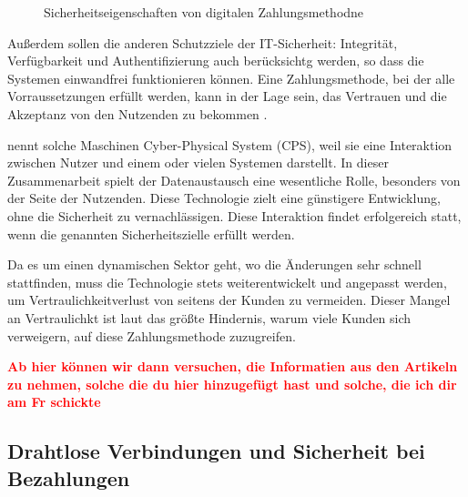 \begin{figure}[htb]
    \caption{Sicherheitseigenschaften von digitalen Zahlungsmethodne}
    \label{fig:refark_HARE}
\end{figure}


Außerdem sollen die anderen Schutzziele der IT-Sicherheit: Integrität, Verfügbarkeit und
Authentifizierung auch berücksichtg werden, so dass die Systemen einwandfrei funktionieren können.
Eine Zahlungsmethode, bei der alle Vorraussetzungen erfüllt werden, kann in der Lage sein, das Vertrauen und 
die Akzeptanz von den Nutzenden zu bekommen \cite{refart:HARE}. 


\cite{inbook:MHNS} nennt solche Maschinen Cyber-Physical System (CPS), weil sie eine Interaktion zwischen 
Nutzer und einem oder vielen Systemen darstellt. In dieser Zusammenarbeit spielt der Datenaustausch 
eine wesentliche Rolle, besonders von der Seite der Nutzenden. Diese Technologie zielt eine günstigere 
Entwicklung, ohne die Sicherheit zu vernachlässigen. Diese Interaktion findet erfolgereich statt, 
wenn die genannten Sicherheitszielle erfüllt werden.


Da es um einen dynamischen Sektor geht, wo die Änderungen sehr schnell stattfinden, \cite{S} 
muss die Technologie stets weiterentwickelt und angepasst werden, um Vertraulichkeitverlust von seitens
der Kunden zu vermeiden. Dieser Mangel an Vertraulichkt ist laut das größte Hindernis, warum viele
Kunden sich verweigern, auf diese Zahlungsmethode zuzugreifen.

\textbf{\textcolor{red}{Ab hier können wir dann versuchen, die Informatien aus den Artikeln zu nehmen, solche
die du hier hinzugefügt hast und solche, die ich dir am Fr schickte}}

\subsection{Drahtlose Verbindungen und Sicherheit bei Bezahlungen}

